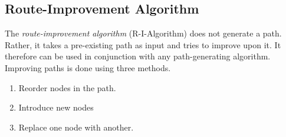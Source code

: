 \subsection{Route-Improvement Algorithm}
\label{subsec:03:rialgo}

The \emph{route-improvement algorithm} (R-I-Algorithm) does not generate a path.
Rather, it takes a pre-existing path as input and tries to improve upon it.
It therefore can be used in conjunction with any path-generating algorithm.
Improving paths is done using three methods.

\begin{enumerate}
	\itemsep0em
	\item Reorder nodes in the path.
	\item Introduce new nodes
	\item Replace one node with another.
\end{enumerate}

\iffalse
\begin{wrapfigure}{l}{0.45\textwidth}
	\centering
	\begin{subfigure}{0.45\textwidth}
		\centering
		\scalebox{0.78}{
			\begin{tikzpicture}[vertex/.style={draw}]
				\foreach \a in {1,...,6}{
						\draw (216-\a*360/10: 2.6cm) node (\a) {$v_\a$};
					}
				\draw[->] (1) -- (2);
				\draw[->] (2) -- (3);
				\draw[->] (3) -- (4);
				\draw[->] (4) -- (5);
				\draw[->] (5) -- (6);
			\end{tikzpicture}
		}
		\caption{A path generated by some algorithm.}
		\label{fig:03:rialgoreorderpath}
	\end{subfigure}
	\begin{subfigure}{0.45\textwidth}
		\centering
		\scalebox{0.78}{
			\begin{tikzpicture}[vertex/.style={draw}]
				\foreach \a in {1,...,6}{
						\draw (216-\a*360/10: 2.6cm) node (\a) {$v_\a$};
					}
				\draw[->] (1) -- (5);
				\draw[->] (5) -- (3);
				\draw[->] (3) -- (4);
				\draw[->] (4) -- (2);
				\draw[->] (2) -- (6);
			\end{tikzpicture}
		}
		\caption{Swapping $v_2$ and $v_5$, keeping the order of the nodes in between.}
		\label{fig:03:rialgoreorderkeep}
	\end{subfigure}
	\begin{subfigure}{0.45\textwidth}
		\centering
		\scalebox{0.78}{
			\begin{tikzpicture}[vertex/.style={draw}]
				\foreach \a in {1,...,6}{
						\draw (216-\a*360/10: 2.6cm) node (\a) {$v_\a$};
					}
				\draw[->] (1) -- (5);
				\draw[->] (5) -- (4);
				\draw[->] (4) -- (3);
				\draw[->] (3) -- (2);
				\draw[->] (2) -- (6);
			\end{tikzpicture}
		}
		\caption{Swapping $v_2$ and $v_5$, \emph{reversing} the order of the nodes in between.}
		\label{fig:03:rialgoreorderreverse}
	\end{subfigure}
	\caption{}
	\label{fig:03:rialgoreorder}
\end{wrapfigure}
\fi

